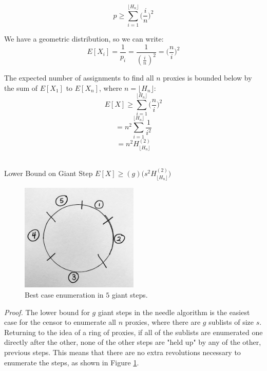 $$p \geq \sum_{i=1}^{\lfloor{H_n}\rfloor} \bigg(\frac{i}{n}\bigg)^2$$

We have a geometric distribution, so we can write: $$E[X_i] = \frac{1}{p_i} = \frac{1}{(\frac{i}{n})^2} = \bigg(\frac{n}{i}\bigg)^2$$

The expected number of assignments to find all $n$ proxies is bounded below by the sum of $E[X_1]$ to $E[X_n]$, where $n=\lfloor{H_n}\rfloor$:\\

$$E[X] \geq \sum_{i=1}^{\lfloor{H_n}\rfloor} \bigg(\frac{n}{i}\bigg)^2$$
$$= n^2 \sum_{i=1}^{\lfloor{H_n}\rfloor} \frac{1}{i^2}$$
$$= n^2H^{(2)}_{\lfloor{H_n}\rfloor}$$\\



\label{LBGS}
\begin{theorem}{Lower Bound on Giant Step $E[X] \geq (g)\bigg(s^2H^{(2)}_{\lfloor{H_n}\rfloor}\bigg)$} 
\end{theorem}

\begin{figure}[h!]
\centering
     \includegraphics[width=0.5\textwidth]{fig/giant_step_lower_bound.png}
    \caption{Best case enumeration in $5$ giant steps.}

    \label{fig:lbgs}
\end{figure}

\emph{Proof.} The lower bound for $g$ giant steps in the needle algorithm is the easiest case for the censor to enumerate all $n$ proxies, where there are $g$ sublists of size $s$. Returning to the idea of a ring of proxies, if all of the sublists are enumerated one directly after the other, none of the other steps are "held up" by any of the other, previous steps. This means that there are no extra revolutions necessary to enumerate the steps, as shown in Figure \ref{fig:lbgs}. 

